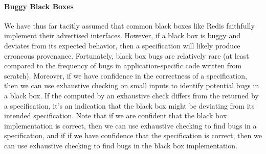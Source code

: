 \paragraph{Buggy Black Boxes}
We have thus far tacitly assumed that common black boxes like Redis faithfully
implement their advertised interfaces.  However, if a black box is buggy and
deviates from its expected behavior, then a \watprovenance{} specification will
likely produce erroneous provenance. Fortunately, black box bugs are relatively
rare (at least compared to the frequency of bugs in application-specific code
written from scratch).
%
Moreover, if we have confidence in the correctness of a \watprovenance{}
specification, then we can use exhaustive \watprovenance{} checking on small
inputs to identify potential bugs in a black box.  If the \watprovenance{}
computed by an exhaustive \watprovenance{} check differs from the
\watprovenance{} returned by a specification, it's an indication that the black
box might be deviating from its intended specification. Note that if we are
confident that the black box implementation is correct, then we can use
exhaustive \watprovenance{} checking to find bugs in a \watprovenance{}
specification, and if if we have confidence that the \watprovenance{}
specification is correct, then we can use exhaustive \watprovenance{} checking
to find bugs in the black box implementation.
